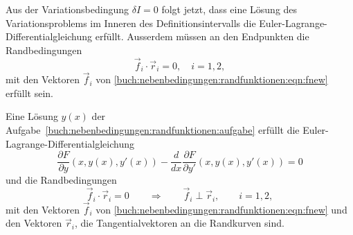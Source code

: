 Aus der Variationsbedingung $\delta I=0$ folgt jetzt, dass eine
Lösung des Variationsproblems im Inneren des Definitionsintervalls
die Euler-Lagrange-Differentialgleichung erfüllt.
Ausserdem müssen an den Endpunkten die Randbedingungen
\begin{equation}
\vec{f}_i\cdot\vec{r}_i
=
0,\quad i=1,2,
\end{equation}
mit den Vektoren $\vec{f}_i$ von
\eqref{buch:nebenbedingungen:randfunktionen:eqn:fnew}
erfüllt sein.

\begin{satz}
\label{buch:nebenbedingungen:randfunktionen:satz:loesung}
Eine Lösung $y(x)$ der
Aufgabe~\ref{buch:nebenbedingungen:randfunktionen:aufgabe}
erfüllt die Euler-Lagrange-Differentialgleichung
\begin{equation}
\frac{\partial F}{\partial y}(x,y(x),y'(x))
-
\frac{d}{dx}
\frac{\partial F}{\partial y'}(x,y(x),y'(x))
=
0
\end{equation}
und die Randbedingungen
\[
\vec{f}_i\cdot \vec{r}_i =  0
\qquad\Rightarrow\qquad
\vec{f}_i\perp\vec{r}_i,\qquad i=1,2,
\]
mit den Vektoren $\vec{f}_i$ von
\eqref{buch:nebenbedingungen:randfunktionen:eqn:fnew}
und den Vektoren $\vec{r}_i$, die Tangentialvektoren an die Randkurven
sind.
\end{satz}



